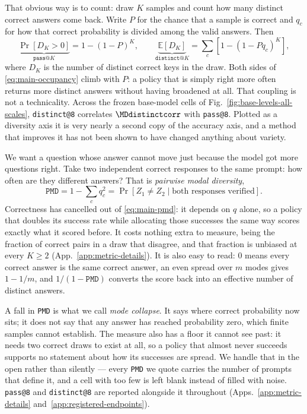 \documentclass{article}
\makeatletter
\newcommand{\1}{\mathbf 1}
\newcommand{\E}{\mathbb E}
\newcommand{\pmd}{\texttt{PMD}}
\newcommand{\distk}{\texttt{distinct@8}}
\theoremstyle{remark}
\theoremstyle{definition}
\theoremstyle{plain}
\makeatother
\begin{document}
That obvious way is to count: draw $K$ samples and count how many distinct
correct answers come back. Write $P$ for the chance that a sample is correct and
$q_c$ for how that correct probability is divided among the valid answers. Then
\begin{equation}
 \underbrace{\Pr[D_K>0]}_{\texttt{pass@}K}=1-(1-P)^K,
 \qquad
 \underbrace{\E[D_K]}_{\texttt{distinct@}K}
 =\sum_c[1-(1-Pq_c)^K],
 \label{eq:main-occupancy}
\end{equation}
where $D_K$ is the number of distinct correct keys in the draw. Both sides of
\eqref{eq:main-occupancy} climb with $P$: a policy that is simply right more
often returns more distinct answers without having broadened at all. That
coupling is not a technicality. Across the \MDcells{} frozen base-model cells of
Fig.~\ref{fig:base-levels-all-scales}, \distk{} correlates $\MDdistinctcorr$
with \texttt{pass@8}. Plotted as a diversity axis it is very nearly a second
copy of the accuracy axis, and a method that improves it has not been shown to
have changed anything about variety.

We want a question whose answer cannot move just because the model got more
questions right. Take two independent correct responses to the same prompt: how
often are they different answers? That is \emph{pairwise modal diversity},
\begin{equation}
 \pmd = 1-\sum_c q_c^2
 = \Pr[Z_1\ne Z_2\mid \text{both responses verified}].
 \label{eq:main-pmd}
\end{equation}
Correctness has cancelled out of \eqref{eq:main-pmd}: it depends on $q$ alone,
so a policy that doubles its success rate while allocating those successes the
same way scores exactly what it scored before. It costs nothing extra to
measure, being the fraction of correct pairs in a draw that disagree, and that
fraction is unbiased at every $K\ge2$ (App.~\ref{app:metric-details}). It is
also easy to read: $0$ means every correct answer is the same correct answer,
an even spread over $m$ modes gives $1-1/m$, and $1/(1-\pmd{})$ converts the
score back into an effective number of distinct answers.

A fall in \pmd{} is what we call \emph{mode collapse}. It says where correct
probability now sits; it does not say that any answer has reached probability
zero, which finite samples cannot establish. The measure also has a floor it
cannot see past: it needs two correct draws to exist at all, so a policy that
almost never succeeds supports no statement about how its successes are spread.
We handle that in the open rather than silently --- every \pmd{} we quote
carries the number of prompts that define it, and a cell with too few is left
blank instead of filled with noise. \texttt{pass@8} and \distk{} are reported
alongside it throughout (Apps.~\ref{app:metric-details}
and~\ref{app:registered-endpoints}).
\end{document}
